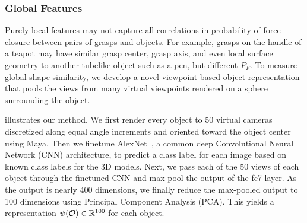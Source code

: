 \subsubsection{Global Features}
Purely local features may not capture all correlations in probability of force closure between pairs of grasps and objects.
For example, grasps on the handle of a teapot may have similar grasp center, grasp axis, and even local surface geometry to another tubelike object such as a pen, but different $P_F$.
To measure global shape similarity, we develop a novel viewpoint-based object representation that pools the views from many virtual viewpoints rendered on a sphere surrounding the object.

 illustrates our method.
We first render every object to 50 virtual cameras discretized along equal angle increments and oriented toward the object center using Maya.
Then we finetune AlexNet~\cite{krizhevsky2012imagenet}, a common deep Convolutional Neural Network (CNN) architecture, to predict a class label for each image based on known class labels for the 3D models.
Next, we pass each of the 50 views of each object through the finetuned CNN and max-pool the output of the fc7 layer.
As the output is nearly 400 dimensions, we finally reduce the max-pooled output to 100 dimensions using Principal Component Analysis (PCA).
This yields a representation $\psi(\mathcal{O}) \in \mathbb{R}^{100}$ for each object.


